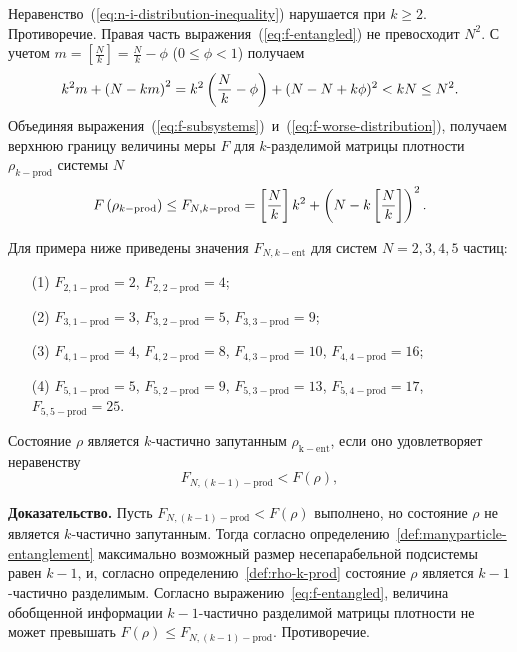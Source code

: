 %
Неравенство~(\ref{eq:n-i-distribution-inequality}) нарушается при $k \geq 2$. Противоречие.
Правая часть выражения~(\ref{eq:f-entangled}) не превосходит $N^2$.
С учетом
$m = \left[\frac{N}{k}\right] = \frac{N}{k} -\phi$ ($0 \leq \phi < 1$)
получаем
%
\begin{equation}
  k^2m + \left( N-km \right)^2
  = k^2\left(\frac{N}{k} - \phi\right) + (N - N +k\phi)^2  < kN \leq N^2.
\end{equation}
%
Объединяя выражения~(\ref{eq:f-subsystems})~и~(\ref{eq:f-worse-distribution}),
получаем верхнюю границу величины меры $F$ для $k$-разделимой матрицы плотности $\rho_{k-\mathrm{prod}}$ системы $N$
%
\begin{equation}\label{eq:f-entangled}
  F\left( \rho_{k-\mathrm{prod}} \right)
  \leq F_{N, k-\mathrm{prod}}
  = \left[ \frac N k \right] k^2 + \left(N - k \left[ \frac N k \right]\right)^2.
\end{equation}
%


Для примера ниже приведены значения $F_{N, k-\mathrm{ent}}$
для систем $N = 2, 3, 4, 5$ частиц:
\begin{itemize}
  \item[(1)]
    $F_{2, 1-\mathrm{prod}}= 2$,
    $F_{2, 2-\mathrm{prod}}= 4$;
  \item[(2)]
    $F_{3, 1-\mathrm{prod}}= 3$,
    $F_{3, 2-\mathrm{prod}}= 5$,
    $F_{3, 3-\mathrm{prod}}= 9$;
  \item[(3)]
    $F_{4, 1-\mathrm{prod}}= 4$,
    $F_{4, 2-\mathrm{prod}}= 8$,
    $F_{4, 3-\mathrm{prod}}= 10$,
    $F_{4, 4-\mathrm{prod}}= 16$;
  \item[(4)]
    $F_{5, 1-\mathrm{prod}}= 5$,
    $F_{5, 2-\mathrm{prod}}= 9$,
    $F_{5, 3-\mathrm{prod}}= 13$,
    $F_{5, 4-\mathrm{prod}}= 17$,
    $F_{5, 5-\mathrm{prod}}= 25$.
\end{itemize}


\begin{theorem}\label{th:entanglement-criteria}
  Состояние $\rho$ является $k$-частично запутанным $\rho_\mathrm{k-ent}$,
  если оно удовлетворяет неравенству
  \begin{equation}\label{eq:entanglement-criteria}
    F_{N, (k-1)-\mathrm{prod}} < F(\rho),
  \end{equation}
\end{theorem}
\textbf{Доказательство.}
Пусть $F_{N, (k-1)-\mathrm{prod}} < F(\rho)$ выполнено,
но состояние $\rho$ не является $k$-частично запутанным.
Тогда согласно определению~\ref{def:manyparticle-entanglement} максимально возможный размер несепарабельной подсистемы равен  $k-1$,
и,
согласно определению~\ref{def:rho-k-prod} состояние $\rho$ является $k-1$-частично разделимым.
Согласно выражению~\ref{eq:f-entangled}, величина обобщенной информации $k-1$-частично разделимой матрицы плотности не может превышать $F(\rho) \leq F_{N, (k-1)-\mathrm{prod}}$.
Противоречие.

